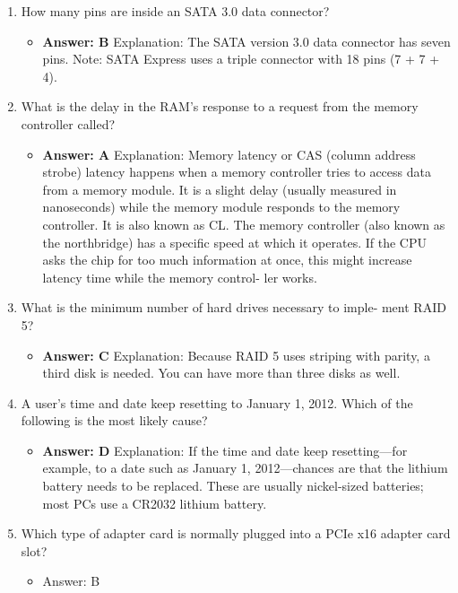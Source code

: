 \documentclass{article}
\begin{document}
\begin{enumerate}
\begin{itemize}
    \end{itemize}
     \item How many pins are inside an SATA 3.0 data connector?
    \begin{itemize}
        \item \textbf{ Answer: B}
Explanation: The SATA version 3.0 data connector has seven pins. Note: SATA Express
uses a triple connector with 18 pins (7 + 7 + 4).
    \end{itemize}
     \item What is the delay in the RAM’s response to a request from the
memory controller called?
    \begin{itemize}
        \item \textbf{Answer: A}
Explanation: Memory latency or CAS (column address strobe) latency happens
when a memory controller tries to access data from a memory module. It is a slight
delay (usually measured in nanoseconds) while the memory module responds to the
memory controller. It is also known as CL. The memory controller (also known as the
northbridge) has a specific speed at which it operates. If the CPU asks the chip for too
much information at once, this might increase latency time while the memory control-
ler works.
    \end{itemize}
     \item What is the minimum number of hard drives necessary to imple-
ment RAID 5?
    \begin{itemize}
        \item \textbf{Answer: C}
Explanation: Because RAID 5 uses striping with parity, a third disk is needed. You can
have more than three disks as well.
    \end{itemize}
     \item A user’s time and date keep resetting to January 1, 2012. Which of
the following is the most likely cause?
    \begin{itemize}
        \item \textbf{Answer: D}
Explanation: If the time and date keep resetting—for example, to a date such as
January 1, 2012—chances are that the lithium battery needs to be replaced. These are
usually nickel-sized batteries; most PCs use a CR2032 lithium battery.
    \end{itemize}
     \item Which type of adapter card is normally plugged into a PCIe x16
adapter card slot?
    \begin{itemize}
        \item Answer: B

\end{itemize}
\end{enumerate}
\end{document}
